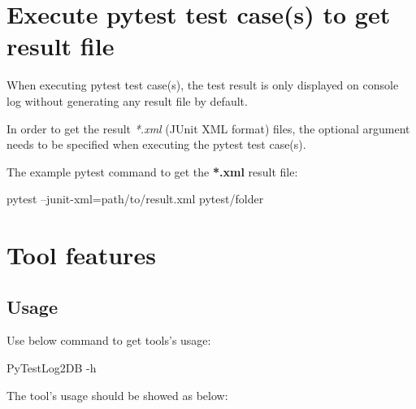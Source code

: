 



\hypertarget{get-the-pytest-xml-result}{%
\section{Execute pytest test case(s) to get result file}\label{get-the-pytest-xml-result}}

  When executing pytest test case(s), the test result is only displayed on
  console log without generating any result file by default.

  In order to get the result \emph{*.xml} (JUnit XML format) files,
  the optional argument  needs to be specified when
  executing the pytest test case(s).

  The example pytest command to get the \textbf{*.xml} result file:

\begin{robotlog}
pytest --junit-xml=path/to/result.xml pytest/folder
\end{robotlog}

\hypertarget{tool-features}{%
\section{Tool features}\label{tool-features}}

  \hypertarget{usage}{%
  \subsection{Usage}\label{usage}}
    Use below command to get tools's usage:
\begin{robotlog}
PyTestLog2DB -h
\end{robotlog}

    The tool's usage should be showed as below:

